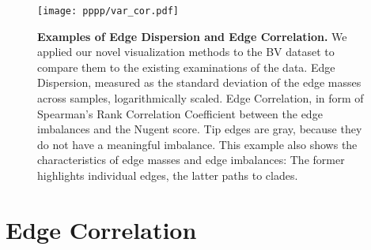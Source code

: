 \begin{figure}[!ht]
    \centering
    \texttt{[image: pppp/var\_cor.pdf]}
    \begin{subfigure}{0pt}
        \label{fig:var_cor:sub:em_varl}
    \end{subfigure}
    \begin{subfigure}{0pt}
        \label{fig:var_cor:sub:ei_var}
    \end{subfigure}
    \caption[Examples of Edge Dispersion and Edge Correlation]{
        \textbf{Examples of Edge Dispersion and Edge Correlation.}
        We applied our novel visualization methods to the \ac{BV} dataset
        to compare them to the existing examinations of the data.
        Edge Dispersion, measured as the standard deviation of the edge masses across samples, logarithmically scaled.
        Edge Correlation, in form of Spearman's Rank Correlation Coefficient
        between the edge imbalances and the Nugent score.
        Tip edges are gray, because they do not have a meaningful imbalance.
        This example also shows the characteristics of edge masses and edge imbalances:
        The former highlights individual edges, the latter paths to clades.
    }
    \label{fig:var_cor}
\end{figure}


\section{Edge Correlation}
\label{ch:Visualization:sec:EdgeCorrelation}

